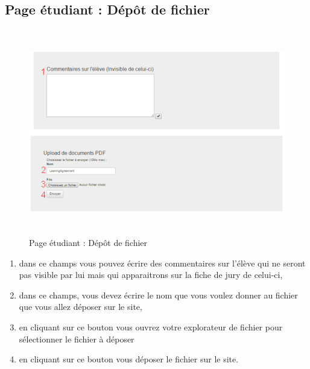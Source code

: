      
          \subsection{Page étudiant : Dépôt de fichier}
          \label{ef}
          \begin{figure}[H]
          	\centering
          	\includegraphics[width=14cm,height=9cm]{Images/Admin/ajout_fichier_admin.png}
          	\caption{Page étudiant : Dépôt de fichier}
          	
          \end{figure}
           \begin{enumerate}
           	\item dans ce champs vous pouvez écrire des commentaires sur l'élève qui ne seront pas visible par lui mais qui apparaitrons sur la fiche de jury de celui-ci,
           	\item dans ce champs, vous devez écrire le nom que vous voulez donner au fichier que vous allez déposer sur le site,
           	\item en cliquant sur ce bouton vous ouvrez votre explorateur de fichier pour sélectionner le fichier à déposer
           	\item en cliquant sur ce bouton vous déposer le fichier sur le site.
           \end{enumerate}
          
